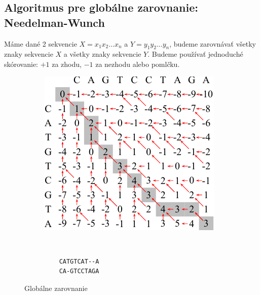 \subsection{Algoritmus pre globálne zarovnanie: Needelman-Wunch}
Máme dané 2 sekvencie $X = x_1x_2\dots x_n$ a $Y = y_1y_2\dots y_n$, budeme zarovnávať všetky znaky sekvencie $X$ a všetky znaky sekvencie $Y$. Budeme používať jednoduché skórovanie: $+1$ za zhodu, $-1$ za nezhodu alebo pomlčku.


\begin{figure}[htp]
    \centering
    \begin{subfigure}[m]{0.5\textwidth}    
    \centering
    \includegraphics[width=\textwidth]{images/global_alignment}
    \end{subfigure}    
    ~
    \begin{subfigure}[m]{0.3\textwidth}    
    \centering
    \begin{verbatim}
    CATGTCAT--A
    CA-GTCCTAGA
    \end{verbatim}
    \end{subfigure}
    \caption{Globálne zarovnanie}
    \label{fig:global_align}
\end{figure}

